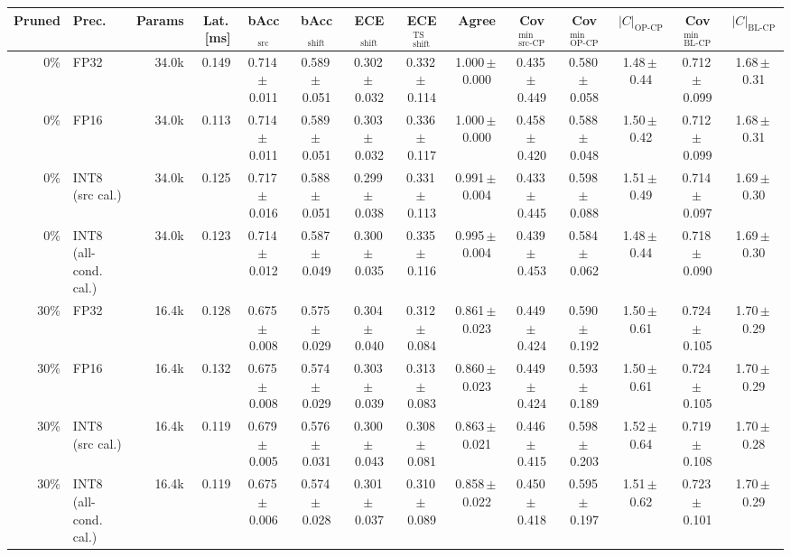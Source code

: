 \begin{tabular}{rl r r cccccccccc}
\toprule
Pruned & Prec. & Params & Lat.\,[ms] & bAcc$_{\mathrm{src}}$ & bAcc$_{\mathrm{shift}}$ & ECE$_{\mathrm{shift}}$ & ECE$^{\mathrm{TS}}_{\mathrm{shift}}$ & Agree & Cov$^{\min}_{\mathrm{src\text{-}CP}}$ & Cov$^{\min}_{\mathrm{OP\text{-}CP}}$ & $|C|_{\mathrm{OP\text{-}CP}}$ & Cov$^{\min}_{\mathrm{BL\text{-}CP}}$ & $|C|_{\mathrm{BL\text{-}CP}}$ \\
\midrule
0\% & FP32 & 34.0k & 0.149 & 0.714\,$\pm$\,0.011 & 0.589\,$\pm$\,0.051 & 0.302\,$\pm$\,0.032 & 0.332\,$\pm$\,0.114 & 1.000\,$\pm$\,0.000 & 0.435\,$\pm$\,0.449 & 0.580\,$\pm$\,0.058 & 1.48\,$\pm$\,0.44 & 0.712\,$\pm$\,0.099 & 1.68\,$\pm$\,0.31 \\
0\% & FP16 & 34.0k & 0.113 & 0.714\,$\pm$\,0.011 & 0.589\,$\pm$\,0.051 & 0.303\,$\pm$\,0.032 & 0.336\,$\pm$\,0.117 & 1.000\,$\pm$\,0.000 & 0.458\,$\pm$\,0.420 & 0.588\,$\pm$\,0.048 & 1.50\,$\pm$\,0.42 & 0.712\,$\pm$\,0.099 & 1.68\,$\pm$\,0.31 \\
0\% & INT8 (src cal.) & 34.0k & 0.125 & 0.717\,$\pm$\,0.016 & 0.588\,$\pm$\,0.051 & 0.299\,$\pm$\,0.038 & 0.331\,$\pm$\,0.113 & 0.991\,$\pm$\,0.004 & 0.433\,$\pm$\,0.445 & 0.598\,$\pm$\,0.088 & 1.51\,$\pm$\,0.49 & 0.714\,$\pm$\,0.097 & 1.69\,$\pm$\,0.30 \\
0\% & INT8 (all-cond. cal.) & 34.0k & 0.123 & 0.714\,$\pm$\,0.012 & 0.587\,$\pm$\,0.049 & 0.300\,$\pm$\,0.035 & 0.335\,$\pm$\,0.116 & 0.995\,$\pm$\,0.004 & 0.439\,$\pm$\,0.453 & 0.584\,$\pm$\,0.062 & 1.48\,$\pm$\,0.44 & 0.718\,$\pm$\,0.090 & 1.69\,$\pm$\,0.30 \\
30\% & FP32 & 16.4k & 0.128 & 0.675\,$\pm$\,0.008 & 0.575\,$\pm$\,0.029 & 0.304\,$\pm$\,0.040 & 0.312\,$\pm$\,0.084 & 0.861\,$\pm$\,0.023 & 0.449\,$\pm$\,0.424 & 0.590\,$\pm$\,0.192 & 1.50\,$\pm$\,0.61 & 0.724\,$\pm$\,0.105 & 1.70\,$\pm$\,0.29 \\
30\% & FP16 & 16.4k & 0.132 & 0.675\,$\pm$\,0.008 & 0.574\,$\pm$\,0.029 & 0.303\,$\pm$\,0.039 & 0.313\,$\pm$\,0.083 & 0.860\,$\pm$\,0.023 & 0.449\,$\pm$\,0.424 & 0.593\,$\pm$\,0.189 & 1.50\,$\pm$\,0.61 & 0.724\,$\pm$\,0.105 & 1.70\,$\pm$\,0.29 \\
30\% & INT8 (src cal.) & 16.4k & 0.119 & 0.679\,$\pm$\,0.005 & 0.576\,$\pm$\,0.031 & 0.300\,$\pm$\,0.043 & 0.308\,$\pm$\,0.081 & 0.863\,$\pm$\,0.021 & 0.446\,$\pm$\,0.415 & 0.598\,$\pm$\,0.203 & 1.52\,$\pm$\,0.64 & 0.719\,$\pm$\,0.108 & 1.70\,$\pm$\,0.28 \\
30\% & INT8 (all-cond. cal.) & 16.4k & 0.119 & 0.675\,$\pm$\,0.006 & 0.574\,$\pm$\,0.028 & 0.301\,$\pm$\,0.037 & 0.310\,$\pm$\,0.089 & 0.858\,$\pm$\,0.022 & 0.450\,$\pm$\,0.418 & 0.595\,$\pm$\,0.197 & 1.51\,$\pm$\,0.62 & 0.723\,$\pm$\,0.101 & 1.70\,$\pm$\,0.29 \\

\end{tabular}
